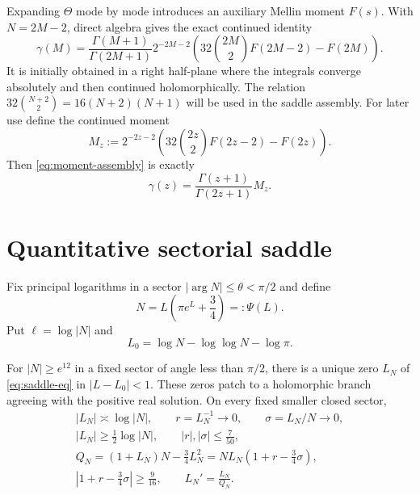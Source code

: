 \documentclass[12pt]{article}
\begin{document}
Expanding $\Theta$ mode by mode introduces an auxiliary Mellin moment $F(s)$.
With $N=2M-2$, direct algebra gives the exact continued identity
\begin{equation}\label{eq:moment-assembly}
 \gamma(M)=\frac{\Gamma(M+1)}{\Gamma(2M+1)}2^{-2M-2}
 \left(32\binom{2M}{2}F(2M-2)-F(2M)\right).
\end{equation}
It is initially obtained in a right half-plane where the integrals converge
absolutely and then continued holomorphically.  The relation
$32\binom{N+2}{2}=16(N+2)(N+1)$ will be used in the saddle assembly.
For later use define the continued moment
\begin{equation}\label{eq:Mz-definition}
 M_z:=2^{-2z-2}\left(32\binom{2z}{2}F(2z-2)-F(2z)\right).
\end{equation}
Then \eqref{eq:moment-assembly} is exactly
\begin{equation}\label{eq:gamma-M}
 \gamma(z)=\frac{\Gamma(z+1)}{\Gamma(2z+1)}M_z.
\end{equation}

\section{Quantitative sectorial saddle}\label{sec:saddle}

Fix principal logarithms in a sector $|\arg N|\le\theta<\pi/2$ and define
\begin{equation}\label{eq:saddle-eq}
 N=L\left(\pi e^L+\frac34\right)=:\Psi(L).
\end{equation}
Put $\ell=\log|N|$ and
\[
 L_0=\log N-\log\log N-\log\pi.
\]

\begin{lemma}\label{lem:saddle}
For $|N|\ge e^{12}$ in a fixed sector of angle less than $\pi/2$, there is a
unique zero $L_N$ of \eqref{eq:saddle-eq} in $|L-L_0|<1$.  These zeros patch
to a holomorphic branch agreeing with the positive real solution.  On every
fixed smaller closed sector,
\begin{gather}
 |L_N|\asymp\log|N|,\qquad
 r=L_N^{-1}\to0,\qquad \sigma=L_N/N\to0,\label{eq:rsigma}\\
 |L_N|\ge\tfrac12\log|N|,\qquad |r|,|\sigma|\le\frac7{50},\label{eq:box-rsigma}\\
 Q_N=(1+L_N)N-\tfrac34L_N^2
 =NL_N(1+r-\tfrac34\sigma),\label{eq:Q}\\
 |1+r-\tfrac34\sigma|\ge\frac9{16},\qquad
 L_N'=\frac{L_N}{Q_N}.
 \label{eq:Lprime}
\end{gather}
\end{lemma}
\end{document}
